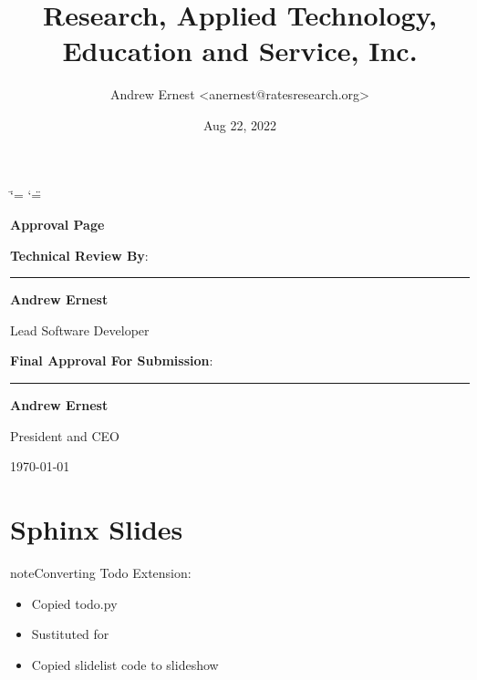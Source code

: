 \documentclass[letterpaper,12pt,english,openany,oneside]{sphinxmanual}
\title{Research, Applied Technology, Education and Service, Inc.}
\date{Aug 22, 2022}
\author{Andrew Ernest <anernest@ratesresearch.org>}
\begin{document}
\ifdefined\shorthandoff
  \ifnum\catcode`\=\string=\active\shorthandoff{=}\fi
  \ifnum\catcode`\"=\active{}\fi
\fi

\pagestyle{empty}
 
\sphinxmaketitle
    \newcommand\signature[3]{%
    {\sffamily
    \vspace{1cm}\par
    \textbf{#1}:\par
        \begin{minipage}{10cm}
        \centering
        \vspace{3cm}\par
        \rule{10cm}{1pt}\par
        \textbf{#2}\par
        #3%
        \end{minipage}
    }
    }
    \newcommand\insertdate[1][\today]{\vfill\begin{flushright}#1\end{flushright}}
    {\LARGE\sffamily \textbf{Approval Page}}
    
    \signature{Technical Review By}{Andrew Ernest}{Lead Software Developer}
    
    \signature{Final Approval For Submission}{Andrew Ernest}{President and CEO}
        
    \insertdate

\pagestyle{plain}
\sphinxtableofcontents
\pagestyle{normal}
\label{\detokenize{index::doc}}


\sphinxstepscope


\chapter{Sphinx Slides}
\label{\detokenize{slides/index:sphinx-slides}}\label{\detokenize{slides/index::doc}}
\begin{sphinxadmonition}{note}{\label{\detokenize{slides/index:id1}}Converting Todo Extension:}\begin{itemize}
\item {} 
\sphinxAtStartPar
Copied todo.py

\item {} 
\sphinxAtStartPar
Sustituted  for 

\item {} 
\sphinxAtStartPar
Copied slidelist code to slideshow

\end{itemize}
\end{sphinxadmonition}
\end{document}
